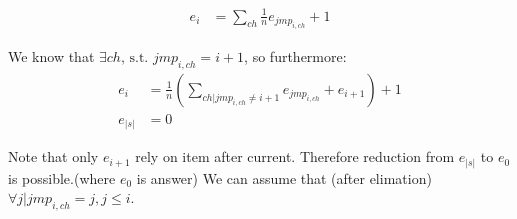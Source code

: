 \documentclass[a5paper, 12pt]{article}
\newcommand \st {\text{, s.t. }}
\begin{document}
\begin{align*}
    e_i &= \sum_{ch}\frac{1}{n}e_{jmp_{i, ch}} + 1
\end{align*}

We know that $\exists ch\st jmp_{i, ch} = i+1$,
so furthermore:
\begin{align*}
    e_i &= \frac{1}{n}(\sum_{ch|jmp_{i, ch} \not= i+1} e_{jmp_{i, ch}} + e_{i + 1}) + 1 \\
    e_{|s|} &= 0
\end{align*}

Note that only $e_{i+1}$ rely on item after current.
Therefore reduction from $e_{|s|}$ to $e_0$ is possible.(where $e_0$ is answer)
We can assume that (after elimation) $\forall j|jmp_{i, ch} = j, j \le i$.
\end{document}
